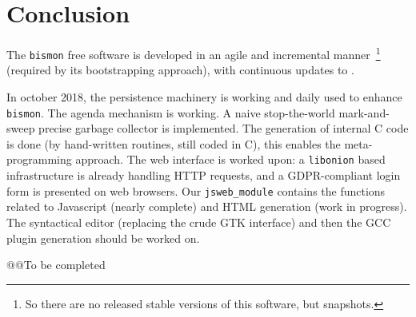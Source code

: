 \section{Conclusion}

The \texttt{bismon} free software is developed in an agile and
incremental manner~\footnote{So there are no released stable versions
  of this software, but snapshots.} (required by its bootstrapping
approach), with continuous updates to
.

In october 2018, the persistence machinery is working and daily used
to enhance \texttt{bismon}. The agenda mechanism is working. A naive
stop-the-world mark-and-sweep precise garbage collector is
implemented. The generation of internal C code is done (by
hand-written routines, still coded in C), this enables the
meta-programming approach. The web interface is worked upon: a
\texttt{libonion} based infrastructure is already handling HTTP
requests, and a GDPR-compliant login form is presented on web
browsers. Our \texttt{jsweb\_module} contains the functions related to
Javascript (nearly complete) and HTML generation (work in progress). The
syntactical editor (replacing the crude GTK interface) and then the
GCC plugin generation should be worked on.

@@To be completed

\medskip

